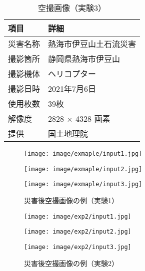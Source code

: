       \begin{table}[t]
        \centering
        \caption{空撮画像（実験3）}
        \label{空撮画像（実験3）}
        \begin{tabular}{ll}
          \hline
          \textbf{項目} & \textbf{詳細} \\
          \hline \hline
          災害名称 & 熱海市伊豆山土石流災害 \\
          撮影箇所 & 静岡県熱海市伊豆山 \\
          撮影機体 & ヘリコプター \\
          撮影日時 & 2021年7月6日 \\
          使用枚数 & 39枚 \\
          解像度 & 2828 $\times$ 4328 画素 \\
          提供 & 国土地理院 \\ \hline
        \end{tabular}
      \end{table}

      \begin{figure}[t]
        \begin{minipage}[c]{0.329\hsize}
          \centering
          \texttt{[image: image/exmaple/input1.jpg]}
        \end{minipage}
        \begin{minipage}[c]{0.329\hsize}
          \centering
          \texttt{[image: image/exmaple/input2.jpg]}
        \end{minipage}
        \begin{minipage}[c]{0.329\hsize}
          \centering
          \texttt{[image: image/exmaple/input3.jpg]}
        \end{minipage}
        \caption{災害後空撮画像の例（実験1）}
        \label{空撮画像1}
      \end{figure}

      \begin{figure}[t]
        \begin{minipage}[c]{0.329\hsize}
          \centering
          \texttt{[image: image/exp2/input1.jpg]}
        \end{minipage}
        \begin{minipage}[c]{0.329\hsize}
          \centering
          \texttt{[image: image/exp2/input2.jpg]}
        \end{minipage}
        \begin{minipage}[c]{0.329\hsize}
          \centering
          \texttt{[image: image/exp2/input3.jpg]}
        \end{minipage}
        \caption{災害後空撮画像の例（実験2）}
        \label{空撮画像2}
      \end{figure}

